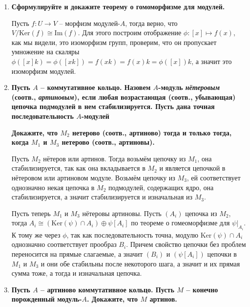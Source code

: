\documentclass{article}
\begin{document}
\begin{enumerate}
    \item \textbf{Сформулируйте и докажите теорему о гомоморфизме для модулей.}

        Пусть $f:U\longrightarrow V$ – морфизм модулей-$A$, тогда верно, что
        $V/\text{Ker}(f)\cong\text{Im}(f)$. Для этого построим отображение
        $\phi: [x]\mapsto f(x)$, как мы видели, это изоморфизм групп, проверим, 
        что он пропускает умножение на скаляры $\phi([x]k)=\phi([xk])=f(xk)=f(x)k
        =\phi([x])k$, а значит это изоморфизм модулей.

    \item \textbf{Пусть $A$ – коммутативное кольцо. Назовем $A$-модуль \textnormal{\textit{нётеровым}}
        (соотв., \textnormal{\textit{артиновым}}), если любая возрастающая (соотв., убывающая) цепочка
        подмодулей в нем стабилизируется. Пусть дана точная последовательность $A$-модулей}
                \begin{center}
                \end{center}
        \textbf{Докажите, что $M_2$ нетерово (соотв., артиново) тогда и только тогда, когда
        $M_1$ и $M_3$ нетерово (соотв., артиновы).}

        Пусть $M_2$ нётеров или артинов. Тогда возьмём цепочку из $M_1$, она
        стабилизируется, так как она вкладывается в $M_2$ и является цепочкой
        в нётеровом или артиновом модуле. Возьмём цепочку из $M_3$, ей
        соответствует однозначно некая цепочка в $M_2$ подмодулей, содержащих
        ядро, она стабилизируется, а значит стабилизируется и изначальная из $M_3$.

        Пусть теперь $M_1$ и $M_3$ нётеровы артиновы. Пусть $(A_i)$ цепочка из
        $M_2$, тогда $A_i\cong(\text{Ker}(\psi)\cap A_i)\oplus\psi[A_i]$ по
        теореме о гомеоморфизме для $\psi|_{A_i}$. К тому же через $\phi$, так
        как последовательность точна, модулю $\text{Ker}(\psi)\cap A_i$
        однозначно соответствует прообраз $B_i$. Причем свойство цепочки без
        проблем переносится на прямые слагаемые, а значит $(B_i)$ и $(\psi[A_i])$
        цепочки в $M_1$ и $M_3$ и они обе стабильны после некоторого шага, а значит и их прямая
        сумма тоже, а тогда и изначальная цепочка.

    \item \textbf{Пусть $A$ – артиново коммутативное кольцо. Пусть $M$ – конечно
        порожденный модуль-$A$. Докажите, что $M$ артинов.}


\end{enumerate}
\end{document}
